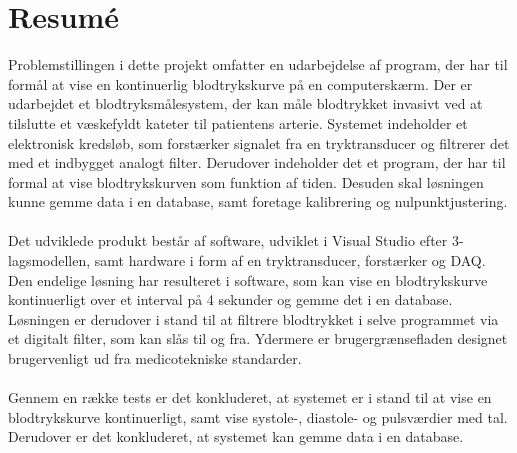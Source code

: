 \chapter{Resumé}
Problemstillingen i dette projekt omfatter en udarbejdelse af program, der har til formål at vise en kontinuerlig blodtrykskurve på en computerskærm. Der er udarbejdet et blodtryksmålesystem, der kan måle blodtrykket invasivt ved at tilslutte et væskefyldt kateter til patientens arterie. Systemet indeholder et elektronisk kredsløb, som forstærker signalet fra en tryktransducer og filtrerer det med et indbygget analogt filter. Derudover indeholder det et program, der har til formal at vise blodtrykskurven som funktion af tiden. Desuden skal løsningen kunne gemme data i en database, samt foretage kalibrering og nulpunktjustering.\\\\
Det udviklede produkt består af software, udviklet i Visual Studio efter 3-lagsmodellen, samt hardware i form af en tryktransducer, forstærker og DAQ. 
Den endelige løsning har resulteret i software, som kan vise en blodtrykskurve kontinuerligt over et interval på 4 sekunder og gemme det i en database. Løsningen er derudover i stand til at filtrere blodtrykket i selve programmet via et digitalt filter, som kan slås til og fra. Ydermere er brugergrænsefladen designet brugervenligt ud fra medicotekniske standarder.\\\\
Gennem en række tests er det konkluderet, at systemet er i stand til at vise en blodtrykskurve kontinuerligt, samt vise systole-, diastole- og pulsværdier med tal. Derudover er det konkluderet, at systemet kan gemme data i en database.

